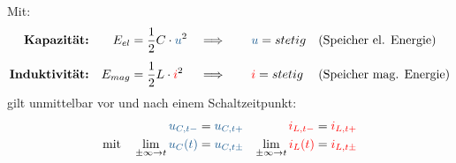 \begin{frame}
{    Mit:
    \begin{align*}
        \textbf{Kapazität:}     && E_{el}  &= \frac{1}{2} C \cdot \ecv{u}^2  &&\Longrightarrow\qquad \ecv{u} = stetig && \text{(Speicher el. Energie)} \\[+4pt]
        \textbf{Induktivität:}  && E_{mag} &= \frac{1}{2} L \cdot \eci{i}^2  &&\Longrightarrow\qquad \eci{i} = stetig && \text{(Speicher mag. Energie)}
    \end{align*}%
    \pause%
    gilt unmittelbar vor und nach einem Schaltzeitpunkt:
    \begin{align*}
        \ecv{u_{C,t-}} &= \ecv{u_{C,t+}} & 
        \eci{i_{L,t-}} &= \eci{i_{L,t+}} \\
        \text{mit}\quad 
        \lim_{\pm\infty \rightarrow t} \ecv{u_C(t)} &= \ecv{u_{C,t\pm}} & 
        \lim_{\pm\infty \rightarrow t} \eci{i_L(t)} &= \eci{i_{L,t\pm}}
    \end{align*}
}
\end{frame}


